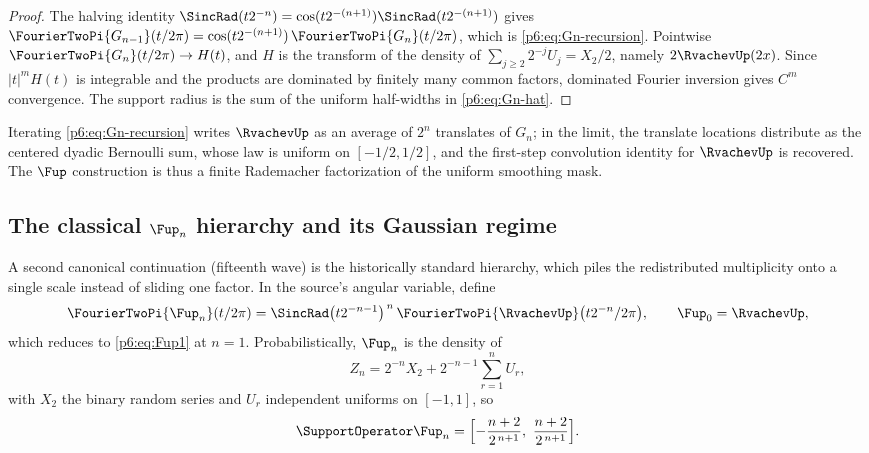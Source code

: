 \documentclass[11pt,oneside]{article}
\numberwithin{equation}{section}
\theoremstyle{definition}
\theoremstyle{remark}
\begin{document}
\begin{proof}
The halving identity $\SincRad(t2^{-n})=\cos(t2^{-(n+1)})\SincRad(t2^{-(n+1)})$
gives $\FourierTwoPi{G_{n-1}}(t/2\pi)=\cos(t2^{-(n+1)})\,\FourierTwoPi{G_n}(t/2\pi)$,
which is \eqref{p6:eq:Gn-recursion}.  Pointwise
$\FourierTwoPi{G_n}(t/2\pi)\to H(t)$, and $H$ is the transform of the density of
$\sum_{j\ge2}2^{-j}U_j=X_2/2$, namely $2\RvachevUp(2x)$.  Since $|t|^mH(t)$ is
integrable and the products are dominated by finitely many common factors,
dominated Fourier inversion gives $C^m$ convergence.  The support radius is the
sum of the uniform half-widths in \eqref{p6:eq:Gn-hat}.
\end{proof}

Iterating \eqref{p6:eq:Gn-recursion} writes $\RvachevUp$ as an average of $2^n$
translates of $G_n$; in the limit, the translate locations distribute as the
centered dyadic Bernoulli sum, whose law is uniform on $[-1/2,1/2]$, and the
first-step convolution identity for $\RvachevUp$ is recovered.  The $\Fup$
construction is thus a finite Rademacher factorization of the uniform smoothing
mask.

\subsection{The classical \texorpdfstring{$\Fup_n$}{Fup-n} hierarchy and its Gaussian regime}

A second canonical continuation (fifteenth wave) is the historically standard
hierarchy, which piles the redistributed multiplicity onto a single scale
instead of sliding one factor.  In the source's angular variable, define
\begin{equation}\label{p6:eq:Fupn-def}
 \FourierTwoPi{\Fup_n}(t/2\pi)
 =\SincRad\bigl(t2^{-n-1}\bigr)^{\,n}\,
  \FourierTwoPi{\RvachevUp}\bigl(t2^{-n}/2\pi\bigr),
 \qquad \Fup_0=\RvachevUp,
\end{equation}
which reduces to \eqref{p6:eq:Fup1} at $n=1$.  Probabilistically, $\Fup_n$ is
the density of
\begin{equation}\label{p6:eq:Zn-def}
 Z_n=2^{-n}X_2+2^{-n-1}\sum_{r=1}^{n}U_r,
\end{equation}
with $X_2$ the binary random series and $U_r$ independent uniforms on
$[-1,1]$, so
\begin{equation}\label{p6:eq:Fupn-support}
 \SupportOperator\Fup_n=
 \Bigl[-\frac{n+2}{2^{\,n+1}},\ \frac{n+2}{2^{\,n+1}}\Bigr].
\end{equation}
\end{document}
